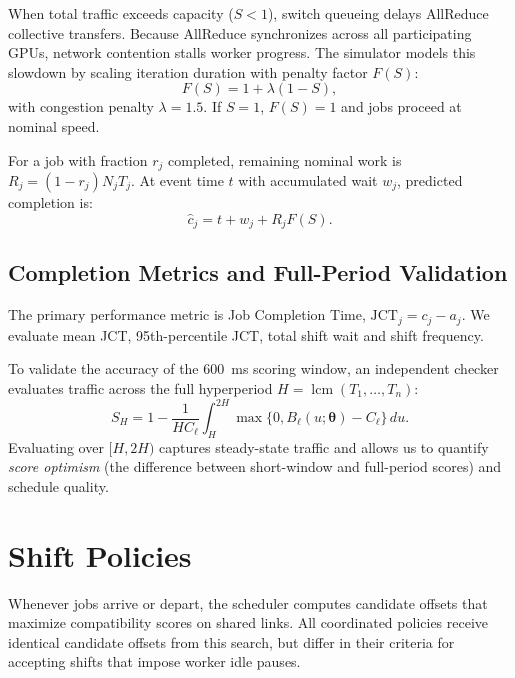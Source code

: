 \documentclass[conference]{IEEEtran}
\begin{document}
When total traffic exceeds capacity ($S < 1$), switch queueing delays AllReduce collective transfers. Because AllReduce synchronizes across all participating GPUs, network contention stalls worker progress. The simulator models this slowdown by scaling iteration duration with penalty factor $F(S)$:
\begin{equation}
 F(S)=1+\lambda(1-S),
 \label{eq:slowdown}
\end{equation}
with congestion penalty $\lambda = 1.5$. If $S = 1$, $F(S) = 1$ and jobs proceed at nominal speed.

For a job with fraction $r_j$ completed, remaining nominal work is $R_j = (1-r_j) N_j T_j$. At event time $t$ with accumulated wait $w_j$, predicted completion is:
\begin{equation}
 \widehat{c}_j = t + w_j + R_j F(S).
 \label{eq:predicted-completion}
\end{equation}

\subsection{Completion Metrics and Full-Period Validation}

The primary performance metric is Job Completion Time, $\mathrm{JCT}_j = c_j - a_j$. We evaluate mean JCT, 95th-percentile JCT, total shift wait and shift frequency.

To validate the accuracy of the 600~ms scoring window, an independent checker evaluates traffic across the full hyperperiod $H = \operatorname{lcm}(T_1, \ldots, T_n)$:
\begin{equation}
 S_H = 1 - \frac{1}{H C_{\ell}} \int_H^{2H}
 \max\{0, B_{\ell}(u;\boldsymbol{\theta}) - C_{\ell}\} \, du.
 \label{eq:full-period-score}
\end{equation}
Evaluating over $[H, 2H)$ captures steady-state traffic and allows us to quantify \emph{score optimism} (the difference between short-window and full-period scores) and schedule quality.

\section{Shift Policies}
\label{sec:policies}

Whenever jobs arrive or depart, the scheduler computes candidate offsets that maximize compatibility scores on shared links. All coordinated policies receive identical candidate offsets from this search, but differ in their criteria for accepting shifts that impose worker idle pauses.
\end{document}
